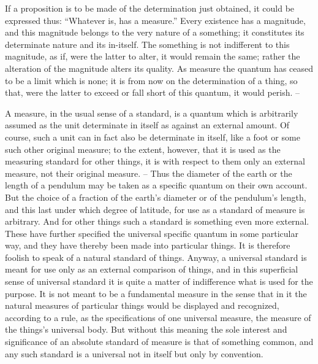 If a proposition is to be made of the determination just obtained, it
could be expressed thus: “Whatever is, has a measure.” Every existence has
a magnitude, and this magnitude belongs to the very nature of a something;
it constitutes its determinate nature and its in-itself. The something is not
indifferent to this magnitude, as if, were the latter to alter, it would remain
the same; rather the alteration of the magnitude alters its quality. As measure
the quantum has ceased to be a limit which is none; it is from now on the
determination of a thing, so that, were the latter to exceed or fall short of
this quantum, it would perish. –

A measure, in the usual sense of a standard, is a quantum which is
arbitrarily assumed as the unit determinate in itself as against an external
amount. Of course, such a unit can in fact also be determinate in itself,
like a foot or some such other original measure; to the extent, however,
that it is used as the measuring standard for other things, it is with respect
to them only an external measure, not their original measure. – Thus the
diameter of the earth or the length of a pendulum may be taken as a
specific quantum on their own account. But the choice of a fraction of the
earth’s diameter or of the pendulum’s length, and this last under which
degree of latitude, for use as a standard of measure is arbitrary. And for
other things such a standard is something even more external. These have
further specified the universal specific quantum in some particular way, and
they have thereby been made into particular things. It is therefore foolish
to speak of a natural standard of things. Anyway, a universal standard
is meant for use only as an external comparison of things, and in this
superficial sense of universal standard it is quite a matter of indifference
what is used for the purpose. It is not meant to be a fundamental measure
in the sense that in it the natural measures of particular things would be
displayed and recognized, according to a rule, as the specifications of one
universal measure, the measure of the things’s universal body. But without
this meaning the sole interest and significance of an absolute standard of
measure is that of something common, and any such standard is a universal
not in itself but only by convention.

